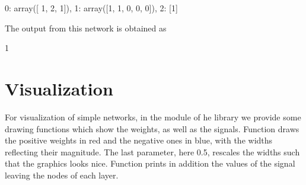 \documentclass[letterpaper,10pt,english]{jupyterBook}
\begin{document}
\begin{sphinxVerbatim}[commandchars=\\\{\}]
\PYGZob{}0: array([ 1,  2, \PYGZhy{}1]), 1: array([1, 1, 0, 0, 0]), 2: [1]\PYGZcb{}
\end{sphinxVerbatim}

\sphinxAtStartPar
The output from this network is obtained as

\begin{sphinxVerbatim}[commandchars=\\\{\}]
\PYG{p}{[}\PYG{p}{]}\PYG{p}{[}\PYG{p}{]}
\end{sphinxVerbatim}

\begin{sphinxVerbatim}[commandchars=\\\{\}]
1
\end{sphinxVerbatim}


\section{Visualization}
\label{\detokenize{docs/more_layers:visualization}}
\sphinxAtStartPar
For visualization of simple networks, in the  module of he  library we provide some drawing functions which show the weights, as well as the signals. Function  draws the positive weights in red and the negative ones in blue, with the widths reflecting their magnitude. The last parameter, here 0.5, rescales  the widths such that the graphics looks nice. Function   prints in addition the values of the signal leaving the nodes of each layer.

\begin{sphinxVerbatim}[commandchars=\\\{\}]
\end{sphinxVerbatim}

\noindent{}

\begin{sphinxVerbatim}[commandchars=\\\{\}]
\end{sphinxVerbatim}
\end{document}
